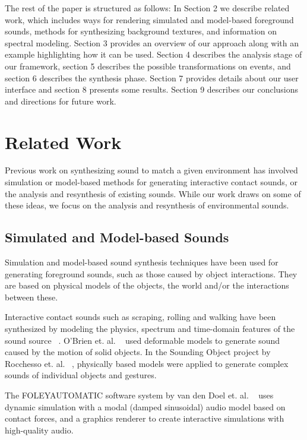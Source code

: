 \documentclass{acmsiggraph}               %
\begin{document}

The rest of the paper is structured as follows: In Section 2 we describe 
related work, which includes ways for rendering simulated and 
model-based foreground sounds, methods for synthesizing background textures, 
and information on spectral modeling. Section 3 provides an overview of our 
approach along with an example highlighting how it can be used. Section 4 
describes the analysis stage of our framework, section 5 describes the possible 
transformations on events, and section 6 describes the synthesis phase. 
Section 7 provides details about our user interface and section 8 
presents some results. Section 9 describes our conclusions and 
directions for future work. 


\section{Related Work}

Previous work on synthesizing sound to match a given environment has 
involved simulation or model-based methods for generating interactive 
contact sounds, or the analysis and resynthesis of existing sounds. 
While our work draws on some of these ideas, we focus on the 
analysis and resynthesis of environmental sounds.

         
\subsection{Simulated and Model-based Sounds}

Simulation and model-based sound synthesis techniques have been 
used for generating foreground sounds, such as those caused by 
object interactions. They are based on physical models of the objects, 
the world and/or the interactions between these. 
 
Interactive contact sounds such as scraping, rolling and walking have 
been synthesized by modeling the physics, spectrum and time-domain features 
of the sound source ~\cite{Cook02,CookBook}. O'Brien et. al. ~ 
used deformable models to generate sound caused by the motion of solid objects. 
In the Sounding Object project by Rocchesso et. al. 
~, physically based models were applied to 
generate complex sounds of individual objects and gestures. 

The FOLEYAUTOMATIC software system by van den Doel et. al. 
~ uses dynamic simulation with a modal (damped 
sinusoidal) audio model based on contact forces, and a graphics renderer 
to create interactive simulations with high-quality audio. 
\end{document}
